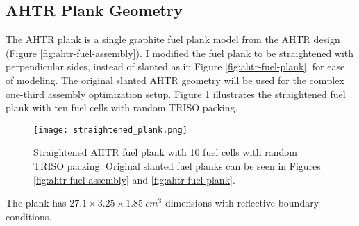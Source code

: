 \subsection{AHTR Plank Geometry}
\label{sec:ahtr-plank-geometry}
The \gls{AHTR} plank is a single graphite fuel plank model from the \gls{AHTR} design (Figure 
\ref{fig:ahtr-fuel-assembly}). 
I modified the fuel plank to be straightened with perpendicular sides, instead 
of slanted as in Figure \ref{fig:ahtr-fuel-plank}, for ease of modeling. 
The original slanted \gls{AHTR} geometry will be used for the complex one-third assembly 
optimization setup. 
Figure \ref{fig:straightened_plank} illustrates the straightened fuel plank with 
ten fuel cells with random \gls{TRISO} packing.
\begin{figure}[]
    \centering
    \texttt{[image: straightened\_plank.png]}
    \raggedright
    \caption{Straightened \acrfull{AHTR} fuel plank with 10 fuel cells with random 
    TRISO packing. Original slanted fuel planks can be seen in Figures 
    \ref{fig:ahtr-fuel-assembly} and \ref{fig:ahtr-fuel-plank}.}
    \label{fig:straightened_plank}
\end{figure}
The plank has $27.1 \times 3.25 \times 1.85\ cm^3$ dimensions with reflective 
boundary conditions.

